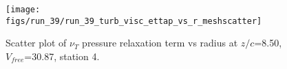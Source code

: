 \begin{figure}[H]
\centering
\texttt{[image: figs/run\_39/run\_39\_turb\_visc\_ettap\_vs\_r\_meshscatter]}
\caption{Scatter plot of $\nu_T$ pressure relaxation term vs radius at $z/c$=8.50, $V_{free}$=30.87, station 4.}
\label{fig:run_39_turb_visc_ettap_vs_r_meshscatter}
\end{figure}


